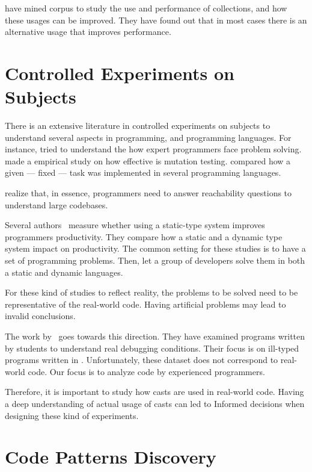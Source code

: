 \cite{costa_empirical_2017} have mined \github{} corpus to study the use and performance of collections, and how these usages can be improved. 
They have found out that in most cases there is an alternative usage that improves performance. 

\section{Controlled Experiments on Subjects}
\label{sec:rw:experiments}

There is an extensive literature \perse{} in controlled experiments on subjects to understand several aspects in programming, and programming languages. 
For instance, \cite{soloway_empirical_1984} tried to understand the how expert programmers face problem solving. 
\cite{budd_theoretical_1980} made a empirical study on how effective is mutation testing. 
\cite{prechelt_empirical_2000} compared how a given --- fixed --- task was implemented in several programming languages. 

\cite{latoza_developers_2010} realize that, in essence, programmers need to answer reachability questions to understand large codebases. 

Several authors~\cite{stuchlik_static_2011,mayer_empirical_2012,harlin_impact_2017} measure whether using a static-type system improves programmers productivity. 
They compare how a static and a dynamic type system impact on productivity. 
The common setting for these studies is to have a set of programming problems. 
Then, let a group of developers solve them in both a static and dynamic languages. 

For these kind of studies to reflect reality, the problems to be solved need to be representative of the real-world code. 
Having artificial problems may lead to invalid conclusions. 

The work by~\cite{wu_how_2017,wu_learning_2017} goes towards this direction. 
They have examined programs written by students to understand real debugging conditions. 
Their focus is on ill-typed programs written in \haskell{}. 
Unfortunately, these dataset does not correspond to real-world code. 
Our focus is to analyze code by experienced programmers. 

Therefore, it is important to study how casts are used in real-world code. 
Having a deep understanding of actual usage of casts can led to 
Informed decisions when designing these kind of experiments. 

\section{Code Patterns Discovery} \label{sec:rw:patterns}

